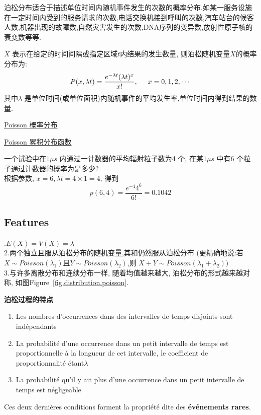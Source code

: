 \documentclass{article}
\begin{document}
泊松分布适合于描述单位时间内随机事件发生的次数的概率分布.如某一服务设施在一定时间内受到的服务请求的次数,电话交换机接到呼叫的次数,汽车站台的候客人数,机器出现的故障数,自然灾害发生的次数,DNA序列的变异数,放射性原子核的衰变数等等.

\bigskip
$X$ 表示在给定的时间间隔或指定区域$t$内结果的发生数量, 则泊松随机变量$X$的概率分布为:
$$
P(x,\lambda t)={\frac  {e^{-\lambda t}(\lambda t) ^{x}}{x!}}, \hspace{0.5cm} x=0,1,2,\cdots
$$
其中$\lambda$ 是单位时间(或单位面积)内随机事件的平均发生率,单位时间内得到结果的数量.

\href{http://upload.wikimedia.org/wikipedia/commons/thumb/c/c1/Poisson\_distribution\_PMF.png/325px-Poisson\_distribution\_PMF.png}{Poisson 概率分布}\label{fig.distribution.poisson}

\href{http://upload.wikimedia.org/wikipedia/commons/thumb/8/84/Poisson\_distribution\_CMF.png/325px-Poisson\_distribution\_CMF.png}{Poisson 累积分布函数}\label{fig.distribution.poisson.pmf}

\begin{example}
一个试验中在$1 \mu s$ 内通过一计数器的平均辐射粒子数为4 个, 在某$1\mu s$ 中有6 个粒子通过计数器的概率为是多少?\\
根据参数, $x=6, \lambda t = 4 \times 1=4$, 得到
$$ p(6,4) = \frac{e^{-4} 4^6}{6!} = 0.1042 $$
\end{example}

\subsection{Features}	
.$E(X)=V(X)=\lambda$ \\
2.两个独立且服从泊松分布的随机变量,其和仍然服从泊松分布 (更精确地说:若$X \sim Poisson(\lambda_1)$且$Y \sim Poisson(\lambda_2)$,则 $X+Y \sim Poisson(\lambda_1+\lambda_2))$\\
3.与许多离散分布和连续分布一样, 随着均值越来越大, 泊松分布的形式越来越对称, 如图Figure~\ref{fig.distribution.poisson}.

\textbf{泊松过程的特点}
\begin{enumerate}
\item Les nombres d'occurrences dans des intervalles de temps disjoints sont ind\'ependants
\item La probabilit\'e d'une occurrence dans un petit intervalle de temps est proportionnelle \`a la longueur de cet intervalle, le coefficient de proportionnalit\'e \'etant$ \lambda$
\item La probabilit\'e qu'il y ait plus d'une occurrence dans un petit intervalle de temps est n\'egligeable
\end{enumerate}
Ces deux derni\`eres conditions forment la propri\'et\'e dite des \textbf{\'ev\'enements rares}.
\end{document}
